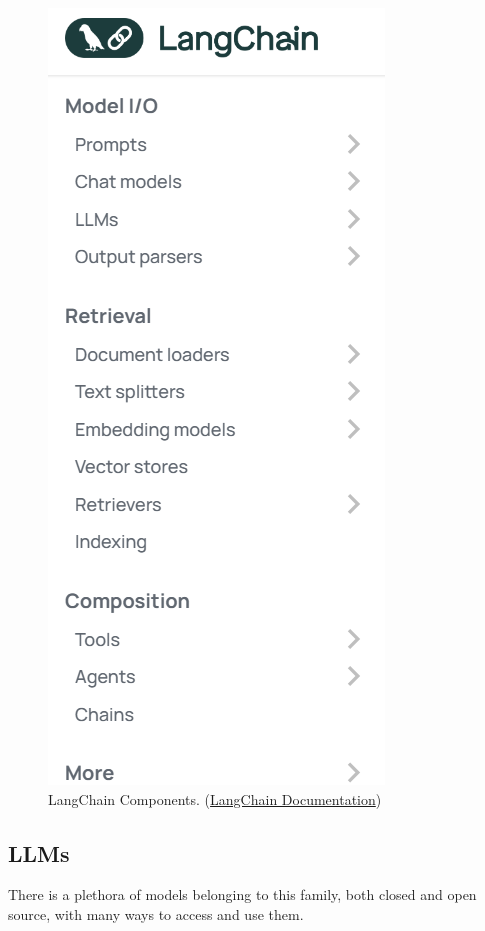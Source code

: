 \begin{figure}[htbp]
    \centering
    \includegraphics[width=.5\linewidth]{./figures/langchain-components.png}
    \caption{LangChain Components. (\href{https://python.langchain.com/v0.1/docs/modules/}{LangChain Documentation})}
\end{figure}\newpage

\subsection{LLMs}
There is a plethora of models belonging to this family, both closed and open source, with many ways to access and use them.

